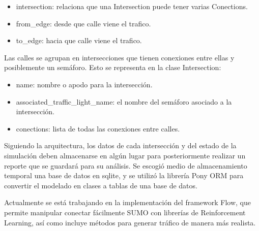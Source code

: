 \begin{itemize}
\item
  intersection: relaciona que una Intersection puede tener varias
  Conections.
\item
  from\_edge: desde que calle viene el trafico.
\item
  to\_edge: hacia que calle viene el trafico.
\end{itemize}

Las calles se agrupan en intersecciones que tienen conexiones entre
ellas y posiblemente un semáforo. Esto se representa en la clase
Intersection:

\begin{itemize}
\item
  name: nombre o apodo para la intersección.
\item
  associated\_traffic\_light\_name: el nombre del semáforo asociado a la
  intersección.
\item
  conections: lista de todas las conexiones entre calles.
\end{itemize}

Siguiendo la arquitectura, los datos de cada intersección y del estado
de la simulación deben almacenarse en algún lugar para posteriormente
realizar un reporte que se guardará para su análisis. Se escogió medio
de almacenamiento temporal una base de datos en sqlite, y se utilizó la
librería Pony ORM para convertir el modelado en clases a tablas de una
base de datos.

Actualmente se está trabajando en la implementación del framework Flow,
que permite manipular conectar fácilmente SUMO con librerías de
Reinforcement Learning, así como incluye métodos para generar tráfico de
manera más realista.

\clearpage %
